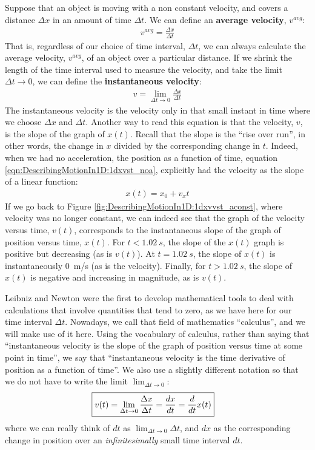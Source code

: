 Suppose that an object is moving with a non constant velocity, and covers a distance $\Delta x$ in an amount of time $\Delta t$. We can define an \textbf{average velocity}, $v^{avg}$:
\begin{align*}
v^{avg}= \frac{\Delta x}{\Delta t}
\end{align*}
That is, regardless of our choice of time interval, $\Delta t$, we can always calculate the average velocity, $v^{avg}$, of an object over a particular distance. If we shrink the length of the time interval used to measure the velocity, and take the limit $\Delta t\to 0$, we can define the \textbf{instantaneous velocity}:
\begin{align*}
v = \lim_{\Delta t\to 0} \frac{\Delta x}{\Delta t}
\end{align*}
The instantaneous velocity is the velocity only in that small instant in time where we choose $\Delta x$ and $\Delta t$. Another way to read this equation is that the velocity, $v$, is the slope of the graph of $x(t)$. Recall that the slope is the ``rise over run'', in other words, the change in $x$ divided by the corresponding change in $t$. Indeed, when we had no acceleration, the position as a function of time, equation \ref{eqn:DescribingMotionIn1D:1dxvst_noa}, explicitly had the velocity as the slope of a linear function:
 \begin{align*}
 x(t) = x_0+v_xt
 \end{align*}
 If we go back to Figure \ref{fig:DescribingMotionIn1D:1dxvvst_aconst}, where velocity was no longer constant, we can indeed see that the graph of the velocity versus time, $v(t)$, corresponds to the instantaneous slope of the graph of position versus time, $x(t)$. For $t<\SI{1.02}{s}$, the slope of the $x(t)$ graph is positive but decreasing (as is $v(t)$). At $t=\SI{1.02}{s}$, the slope of $x(t)$ is instantaneously \SI{0}{m/s} (as is the velocity). Finally, for $t>\SI{1.02}{s}$, the slope of $x(t)$ is negative and increasing in magnitude, as is $v(t)$.

Leibniz and Newton were the first to develop mathematical tools to deal with calculations that involve quantities that tend to zero, as we have here for our time interval $\Delta t$. Nowadays, we call that field of mathematics ``calculus'', and we will make use of it here. Using the vocabulary of calculus, rather than saying that ``instantaneous velocity is the slope of the graph of position versus time at some point in time'', we say that ``instantaneous velocity is the time derivative of position as a function of time''. We also use a slightly different notation so that we do not have to write the limit $\lim_{\Delta t\to 0}$:
\begin{align}
\label{eqn:DescribingMotionIn1D:vdef}
\Aboxed{v(t)=\lim_{\Delta t\to 0} \frac{\Delta x}{\Delta t}=\frac{dx}{dt}=\frac{d}{dt} x(t)}
\end{align}
where we can really think of $dt$ as $\lim_{\Delta t\to 0}\Delta t$, and $dx$ as the corresponding change in position over an \textit{infinitesimally} small time interval $dt$.

